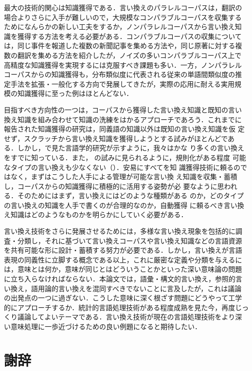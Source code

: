最大の技術的関心は知識獲得である．言い換えのパラレルコーパスは，翻訳の
場合よりさらに入手が難しいので，大規模なコンパラブルコーパスを収集する
ためになんらかの新しい工夫をするか，ノンパラレルコーパスから言い換え知
識を獲得する方法を考える必要がある．コンパラブルコーパスの収集について
は，同じ事件を報道した複数の新聞記事を集める方法や，同じ原著に対する複
数の翻訳を集める方法を紹介したが，ノイズの多いコンパラブルコーパス上で
高精度な知識獲得を実現するには克服すべき課題も多い．一方，ノンパラレル
コーパスからの知識獲得も，分布類似度に代表される従来の単語間類似度の推
定手法を拡張・一般化する方向で発展してきたが，実際の応用に耐える実用規
模の知識獲得に至った例はほとんどない．

目指すべき方向性の一つは，コーパスから獲得した言い換え知識と既知の言い
換え知識を組み合わせて知識の洗練をはかるアプローチであろう．これまでに
報告された知識獲得の研究は，同義語の知識以外は既知の言い換え知識を仮
定せず，スクラッチから言い換え知識を獲得しようとする試みがほとんどであ
る．しかし，で見た言語学的研究が示すように，我々はかな
り多くの言い換えをすでに知っている．また，
の試みに見られるように，規則化がある程度
可能なタイプの言い換えも少なくない（）．安易にすべてを知
識獲得技術に頼るのではなく，まずはこうした人手による管理が可能な言い換
え知識を収集・蓄積し，コーパスからの知識獲得に積極的に活用する姿勢が必
要なように思われる．そのためにはまず，言い換えにはどのような種類がある
のか，どのタイプの言い換えの知識を人手で書くのが合理的なのか，自動獲得
に頼るべき言い換え知識はどのようなものかを明らかにしていく必要がある．

言い換え技術をさらに発展させるためには，多様な言い換え現象を包括的に調
査・分類し，それに基づいて言い換えコーパスや言い換え知識などの言語資源
を共有可能な形に設計・蓄積する努力が必要である．しかし，言い換えが言語
表現の同義性に立脚する概念である以上，これに厳密な定義や分類を与えるに
は，意味とは何か，意味が同じとはどういうことかといった深い意味論の問題
に立ち入らなければならない．本論文では，語彙・構文的言い換え，参照的言
い換え，語用論的言い換えを混同すべきでないことに言及したが，これは議論
の出発点の一つに過ぎない．こうした意味に深く根ざす問題にどうやって工学
的にアプローチするか．統計的言語処理技術がある程度成熟を見た今，再度じっ
くり議論してよいテーマである．言い換え技術が現在の言語処理技術をより深
い意味処理に一歩近づけるための良い例題になると期待したい．

\section*{謝辞}

